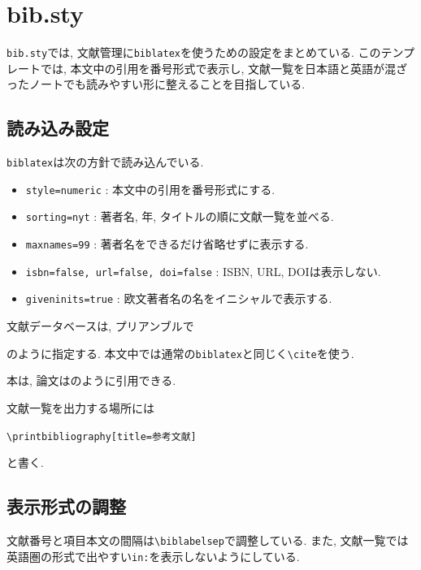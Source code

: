 \documentclass[../main.tex]{subfiles}
\begin{document}
\section{bib.sty}

\texttt{bib.sty}では, 文献管理に\texttt{biblatex}を使うための設定をまとめている. 
このテンプレートでは, 本文中の引用を番号形式で表示し, 文献一覧を日本語と英語が混ざったノートでも読みやすい形に整えることを目指している. 

\subsection{読み込み設定}

\texttt{biblatex}は次の方針で読み込んでいる. 
\begin{itemize}
	\item \texttt{style=numeric} : 本文中の引用を番号形式にする. 
	\item \texttt{sorting=nyt} : 著者名, 年, タイトルの順に文献一覧を並べる. 
	\item \texttt{maxnames=99} : 著者名をできるだけ省略せずに表示する. 
	\item \texttt{isbn=false, url=false, doi=false} : ISBN, URL, DOIは表示しない. 
	\item \texttt{giveninits=true} : 欧文著者名の名をイニシャルで表示する. 
\end{itemize}

文献データベースは, プリアンブルで
\begin{center}
	\verb||
\end{center}
のように指定する. 
本文中では通常の\texttt{biblatex}と同じく\verb|\cite|を使う. 

\begin{ex}{}{}
	本は\cite{本引用ラベル}, 論文は\cite{論文引用ラベル}のように引用できる. 
\end{ex}

文献一覧を出力する場所には
\begin{center}
	\verb|\printbibliography[title=参考文献]|
\end{center}
と書く. 

\subsection{表示形式の調整}

文献番号と項目本文の間隔は\verb|\biblabelsep|で調整している. 
また, 文献一覧では英語圏の形式で出やすい\texttt{in:}を表示しないようにしている. 
\end{document}
